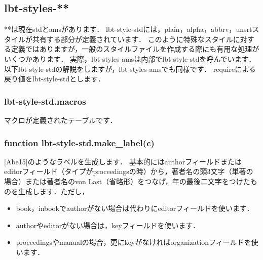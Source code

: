 \documentclass[dvipdfmx,a4paper]{jsarticle}
\begin{document}
\subsection{lbt-styles-**}
**は現在stdとamsがあります．
lbt-style-stdには，plain，alpha，abbrv，unsrtスタイルが共有する部分が定義されています．
このように特殊なスタイルに対する定義ではありますが，一般のスタイルファイルを作成する際にも有用な処理がいくつかあります．
実際，lbt-styles-amsは内部でlbt-style-stdを呼んでいます．
以下lbt-style-stdの解説をしますが，lbt-styles-amsでも同様です．
requireによる戻り値をlbt-style-stdとします．
\subsubsection{lbt-style-std.macros}
マクロが定義されたテーブルです．

\subsubsection{function lbt-style-std.make\_label(c)}
[Abe15]のようなラベルを生成します．
基本的にはauthorフィールドまたはeditorフィールド（タイプがproceedingsの時）から，著者名の頭3文字（単著の場合）または著者名のvon Last（省略形）をつなげ，年の最後二文字をつけたものを生成します．ただし，
\begin{itemize}
\item book，inbookでauthorがない場合は代わりにeditorフィールドを使います．
\item authorやeditorがない場合は，keyフィールドを使います．
\item proceedingsやmanualの場合，更にkeyがなければorganizationフィールドを使います．
\end{itemize}
\end{document}
